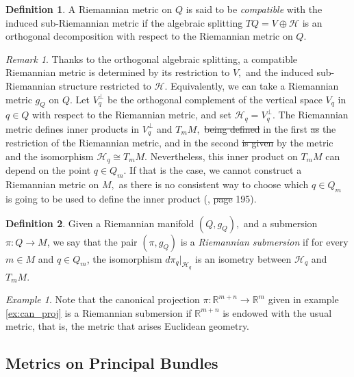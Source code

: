 \documentclass[12pt, letterpaper, reqno]{amsart}
\theoremstyle{definition}
\newtheorem{df}{Definition}
\theoremstyle{plain}
\theoremstyle{remark}
\newtheorem{ex}{Example}
\newtheorem{rem}{Remark}
\providecommand{\DIFadd}[1]{{\protect\color{blue}\uwave{#1}}} %
\providecommand{\DIFdel}[1]{{\protect\color{red}\sout{#1}}}                      %
\providecommand{\DIFaddbegin}{} %
\providecommand{\DIFaddend}{} %
\providecommand{\DIFdelbegin}{} %
\providecommand{\DIFdelend}{} %
\newcommand{\DIFscaledelfig}{0.5}
\newlength{\DIFdelgraphicswidth} %
\newlength{\DIFdelgraphicsheight} %
\newcommand{\DIFaddincludegraphics}[2][]{{\color{blue}\fbox{\DIFOincludegraphics[#1]{#2}}}} %
\newcommand{\DIFdelincludegraphics}[2][]{%
\sbox{\DIFdelgraphicsbox}{\DIFOincludegraphics[#1]{#2}}%
\settoboxwidth{\DIFdelgraphicswidth}{\DIFdelgraphicsbox} %
\settoboxtotalheight{\DIFdelgraphicsheight}{\DIFdelgraphicsbox} %
\scalebox{\DIFscaledelfig}{%
\parbox[b]{\DIFdelgraphicswidth}{\usebox{\DIFdelgraphicsbox}\\[-\baselineskip] \rule{\DIFdelgraphicswidth}{0em}}\llap{\resizebox{\DIFdelgraphicswidth}{\DIFdelgraphicsheight}{%
\setlength{\unitlength}{\DIFdelgraphicswidth}%
\begin{picture}(1,1)%
\thicklines\linethickness{2pt} %
{\color[rgb]{1,0,0}\put(0,0){\framebox(1,1){}}}%
{\color[rgb]{1,0,0}\put(0,0){\line( 1,1){1}}}%
{\color[rgb]{1,0,0}\put(0,1){\line(1,-1){1}}}%
\end{picture}%
}\hspace*{3pt}}} %
} %
\DeclareRobustCommand{\DIFaddbegin}{\DIFOaddbegin \let\includegraphics\DIFaddincludegraphics} %
\DeclareRobustCommand{\DIFaddend}{\DIFOaddend \let\includegraphics\DIFOincludegraphics} %
\DeclareRobustCommand{\DIFdelbegin}{\DIFOdelbegin \let\includegraphics\DIFdelincludegraphics} %
\DeclareRobustCommand{\DIFdelend}{\DIFOaddend \let\includegraphics\DIFOincludegraphics} %
\begin{document}
\begin{df}\label{df:compatible}
	A Riemannian metric on $ Q $ is said to be \textit{compatible} with the induced sub-Riemannian metric if the algebraic splitting $ TQ = V \oplus \mathcal{H} $ is an orthogonal decomposition with respect to the Riemannian metric on $ Q$.  
\end{df}

\begin{rem}
Thanks to the orthogonal algebraic splitting, a compatible Riemannian metric is determined by its restriction to $ V, $ and the induced sub-Riemannian structure restricted to $ \mathcal{H} $. Equivalently, we can take a Riemannian metric $ g_Q $ on $ Q. $ Let $ V_q^\perp $ be the orthogonal complement of the vertical space $ V_q $ in $ q\in Q $ with respect to the Riemannian metric, and set $ \mathcal{H}_q=V_q^\perp. $ The Riemannian metric defines inner products in $ V_q^\perp $  and $ T_mM, $ \DIFdelbegin \DIFdel{being defined }\DIFdelend in the first \DIFdelbegin \DIFdel{as }\DIFdelend \DIFaddbegin \DIFadd{case, by }\DIFaddend the restriction of the Riemannian metric, and in the second \DIFdelbegin \DIFdel{is given }\DIFdelend \DIFaddbegin \DIFadd{case, }\DIFaddend by the metric and the isomorphism $ \mathcal{H}_q\cong T_mM. $ Nevertheless, this inner product on $ T_mM $ can depend on the point $ q\in Q_m $. If that is the case, we cannot construct a Riemannian metric on $ M, $ as there is no consistent way to choose which $ q\in Q_m $ is going to be used to define the inner product (\cite{montgomery2002tour}, \DIFdelbegin \DIFdel{page }\DIFdelend \DIFaddbegin \DIFadd{p. }\DIFaddend 195).
\end{rem}

\begin{df}\label{def:riemannian_submersion}
	Given a Riemannian manifold $ (Q, g_Q),$ and a submersion $ \pi: Q \rightarrow {M}
	$, we say that the pair $ (\pi, g_Q) $ is a \textit{Riemannian submersion} if for every $ m\in M $ and $ q\in Q_m $,  the isomorphism $ d\pi_q |_{\mathcal{H}_q} $ is an isometry between $ \mathcal{H}_q $ and $ T_m M$. 
\end{df}
\begin{ex}
	Note that the canonical projection $ \pi : \mathbb{R}^{m+n} \rightarrow \mathbb{R}^m $ given in example \ref{ex:can_proj} is a Riemannian submersion if $ \mathbb{R}^{m+n} $ is endowed with the usual metric, that is, the metric that arises Euclidean geometry.
\end{ex}
\subsection{Metrics on Principal Bundles}%
\label{sub:metrics_on_principal_bundles}
\end{document}
